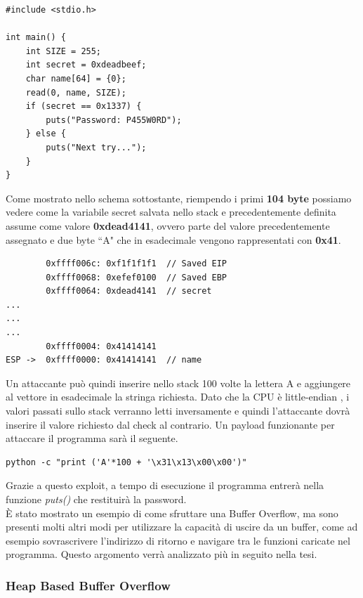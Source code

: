 \begin{verbatim}
#include <stdio.h>

int main() {
    int SIZE = 255;
    int secret = 0xdeadbeef;
    char name[64] = {0};
    read(0, name, SIZE);
    if (secret == 0x1337) {
        puts("Password: P455W0RD");
    } else {
        puts("Next try...");
    }
}

\end{verbatim}

Come mostrato nello schema sottostante, riempendo i primi \textbf{104 byte} possiamo vedere come la variabile secret salvata nello stack e precedentemente definita assume come valore \textbf{0xdead4141}, ovvero parte del valore precedentemente assegnato e due byte ``A" che in esadecimale vengono rappresentati con \textbf{0x41}. 

\begin{verbatim}
        0xffff006c: 0xf1f1f1f1  // Saved EIP
        0xffff0068: 0xefef0100  // Saved EBP
        0xffff0064: 0xdead4141  // secret
...
...
...
        0xffff0004: 0x41414141
ESP ->  0xffff0000: 0x41414141  // name
\end{verbatim}

Un attaccante può quindi inserire nello stack 100 volte la lettera A e aggiungere al vettore in esadecimale la stringa richiesta. Dato che la CPU è little-endian \cite{Geeksforgeeks}, i valori passati sullo stack verranno letti inversamente e quindi l'attaccante dovrà inserire il valore richiesto dal check al contrario. Un payload funzionante per attaccare il programma sarà il seguente.

\begin{verbatim}
python -c "print ('A'*100 + '\x31\x13\x00\x00')"
\end{verbatim}

Grazie a questo exploit, a tempo di esecuzione il programma entrerà nella funzione \textit{puts()} che restituirà la password.  \\
\newline
È stato mostrato un esempio di come sfruttare una Buffer Overflow, ma sono presenti molti altri modi per utilizzare la capacità di uscire da un buffer, come ad esempio sovrascrivere l'indirizzo di ritorno e navigare tra le funzioni caricate nel programma. Questo argomento verrà analizzato più in seguito nella tesi.

\subsubsection*{Heap Based Buffer Overflow}

